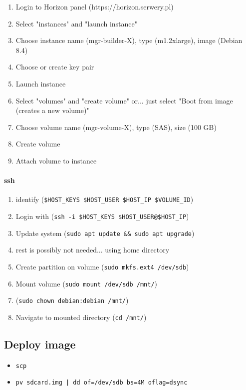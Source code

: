 \documentclass[printmode]{mgr}
\begin{document}
\begin{enumerate}
  \item Login to Horizon panel (https://horizon.serwery.pl)
  \item Select "instances" and "launch instance"
  \item Choose instance name (mgr-builder-X), type (m1.2xlarge), image (Debian 8.4)
  \item Choose or create key pair
  \item Launch instance
  \item Select "volumes" and "create volume" or... just select "Boot from image (creates a new volume)" 
  \item Choose volume name (mgr-volume-X), type (SAS), size (100 GB)
  \item Create volume
  \item Attach volume to instance
\end{enumerate}

\paragraph{ssh}

\begin{enumerate}
  \item identify (\verb|$HOST_KEYS $HOST_USER $HOST_IP $VOLUME_ID|)
  \item Login with (\verb|ssh -i $HOST_KEYS $HOST_USER@$HOST_IP|)
  \item Update system (\verb|sudo apt update && sudo apt upgrade|)
  \item rest is possibly not needed... using home directory
  \item Create partition on volume (\verb|sudo mkfs.ext4 /dev/sdb|)
  \item Mount volume (\verb|sudo mount /dev/sdb /mnt/|)
  \item (\verb|sudo chown debian:debian /mnt/|)
  \item Navigate to mounted directory (\verb|cd /mnt/|)
\end{enumerate}

\subsection{Deploy image}

\begin{itemize}
  \item \verb|scp|
  \item \verb!pv sdcard.img | dd of=/dev/sdb bs=4M oflag=dsync!
\end{itemize}
\end{document}
